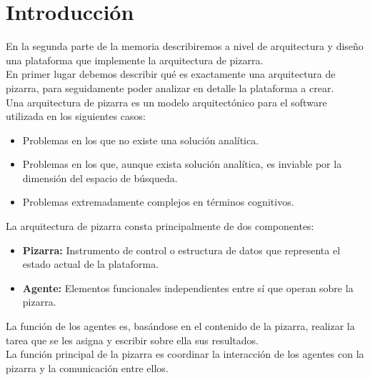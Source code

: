 \chapter{Introducción}
\lettrine[lines=1,slope=4pt,findent=0pt]{E}{}n la segunda parte de la memoria describiremos a nivel de arquitectura y diseño una plataforma que implemente la arquitectura de pizarra. \\

En primer lugar debemos describir qué es exactamente una arquitectura de pizarra, para seguidamente poder analizar en detalle la plataforma a crear.\\

Una arquitectura de pizarra es un modelo arquitectónico para el software utilizada en los siguientes casos:

\begin{itemize}
	\item Problemas en los que no existe una solución analítica.
	\item Problemas en los que, aunque exista solución analítica, es inviable por la dimensión del espacio de búsqueda.
	\item Problemas extremadamente complejos en términos cognitivos.
\end{itemize}

La arquitectura de pizarra consta principalmente de dos componentes:

\begin{itemize}
	\item \textbf{Pizarra: }Instrumento de control o estructura de datos que representa el estado actual de la plataforma.
	\item \textbf{Agente: }Elementos funcionales independientes entre sí que operan sobre la pizarra.
\end{itemize}

La función de los agentes es, basándose en el contenido de la pizarra, realizar la tarea que se les asigna y escribir sobre ella sus resultados.\\

La función principal de la pizarra es coordinar la interacción de los agentes con la pizarra y la comunicación entre ellos.
